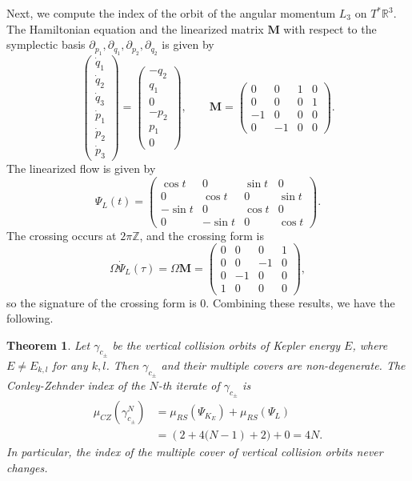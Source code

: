 \documentclass{amsart}
\newcommand{\Z}{\mathbb{Z}}
\newcommand{\R}{\mathbb{R}}
\newcommand{\g}{\gamma}
\newcommand{\pp}{\partial}
\newtheorem{thm}{Theorem}[section]
\begin{document}
Next, we compute the index of the orbit of the angular momentum $L_3$ on $T^*\R^3$.
The Hamiltonian equation and the linearized matrix $\mathbf{M}$ with respect to the symplectic basis $\pp_{p_1},\pp_{q_1},\pp_{p_2},\pp_{q_2}$ is given by
$$
\begin{pmatrix}
	\dot{q}_1\\
	\dot{q}_2\\
	\dot{q}_3\\
	\dot{p}_1\\
	\dot{p}_2\\
	\dot{p}_3
\end{pmatrix}
=
\begin{pmatrix}
	-q_2\\
	q_1\\
	0\\
	-p_2\\
	p_1\\
	0
\end{pmatrix},
\qquad
\mathbf{M} = \begin{pmatrix}
	0&0&1&0\\
	0&0&0&1\\
	-1&0&0&0\\
	0&-1&0&0
\end{pmatrix}.
$$
The linearized flow is given by
$$
\Psi_L(t) = \begin{pmatrix}
	\cos t&0&\sin t&0\\
	0&\cos t&0&\sin t\\
	-\sin t&0&\cos t&0\\
	0&-\sin t&0&\textit{}\cos t
\end{pmatrix}.
$$
The crossing occurs at $2\pi\Z$, and the crossing form is
$$
\Omega\dot{\Psi}_L(\tau) = \Omega\mathbf{M} = \begin{pmatrix}
	0&0&0&1\\
	0&0&-1&0\\
	0&-1&0&0\\
	1&0&0&0
\end{pmatrix},
$$
so the signature of the crossing form is 0.
Combining these results, we have the following.
\begin{thm}\label{Theorem - Index of Collision}
	Let $\g_{c_\pm}$ be the vertical collision orbits of Kepler energy $E$, where $E\neq E_{k,l}$ for any $k,l$.
	Then $\g_{c_\pm}$ and their multiple covers are non-degenerate.
	The Conley-Zehnder index of the $N$-th iterate of $\g_{c_\pm}$ is
	$$
	\begin{aligned}
		\mu_{CZ}(\g^N_{c_\pm})&=\mu_{RS}(\Psi_{K_E}) + \mu_{RS}(\Psi_L)\\
		&=\left(2+4(N-1\right) + 2)+ 0 = 4N.
	\end{aligned}
	$$
	In particular, the index of the multiple cover of vertical collision orbits never changes.
\end{thm}
\end{document}
